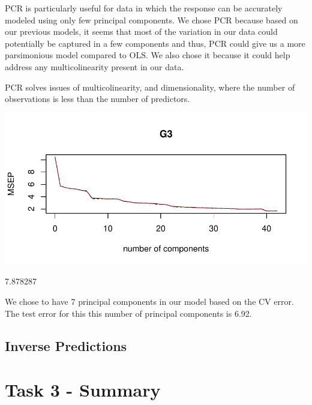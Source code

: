 \documentclass{article}
\begin{document}
PCR is particularly useful for data in which the response can be accurately modeled using only few principal components. We chose PCR because based on our previous models, it seems that most of the variation in our data could potentially be captured in a few components and thus, PCR could give us a more parsimonious model compared to OLS. We also chose it because it could help address any multicolinearity present in our data.

PCR solves issues of multicolinearity, and dimensionality, where the number of observations is less than the number of predictors. 

\includegraphics{Report_4-013}


\begin{Schunk}
\begin{Soutput}
[1] 7.878287
\end{Soutput}
\end{Schunk}


We chose to have 7 principal components in our model based on the CV error. The test error for this this number of principal components is 6.92.

\subsection{Inverse Predictions}

\section{Task 3 - Summary}
\end{document}
